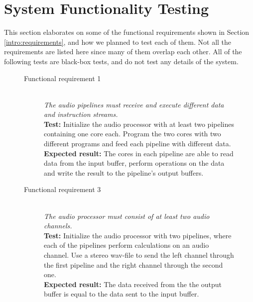 \section{System Functionality Testing}

This section elaborates on some of the functional requirements shown in Section
\ref{intro:requirements}, and how we planned to test each of them. Not all the
requirements are listed here since many of them overlap each other. All of the following tests are black-box tests, and do not test any details of the system.

\begin{figure}[H]
    \label{test:func-test1}
    \begin{description}
        \item[Functional requirement 1] \hfill \\
            \textit{The audio pipelines must receive and execute different data and instruction streams.} \\
            \textbf{Test:} Initialize the audio processor with at least two pipelines
            containing one core each. Program the two cores with two different programs and feed
            each pipeline with different data.\\
            \textbf{Expected result:} The cores in each pipeline are able to read data from the input buffer,
            perform operations on the data and write the result to the pipeline's output buffers.
    \end{description}
\end{figure}

\begin{figure}[H]
    \label{test:func-test3}
    \begin{description}
        \item[Functional requirement 3] \hfill \\
            \textit{The audio processor must consist of at least two audio channels.} \\
            \textbf{Test:} Initialize the audio processor with two pipelines, where each of the
            pipelines perform calculations on an audio channel. Use a stereo wav-file to send
            the left channel through the first pipeline and the right channel through the
            second one. \\
            \textbf{Expected result:} The data received from the the output buffer is equal to the
            data sent to the input buffer.
    \end{description}
\end{figure}

